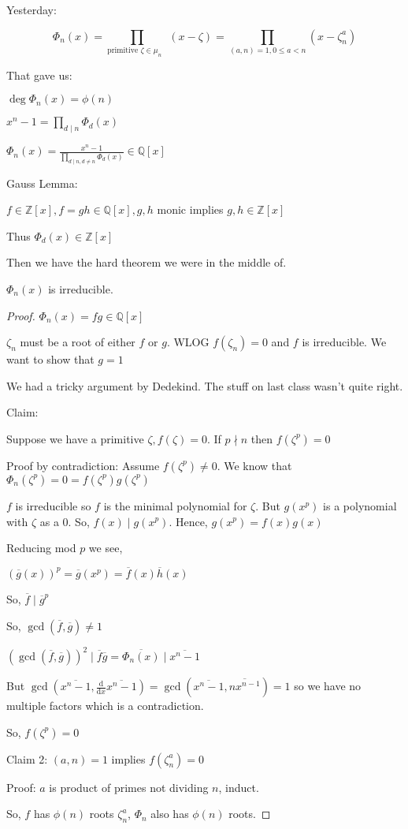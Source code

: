 \documentclass{article}
\theoremstyle{definition}
\begin{document}
Yesterday:

\[
    \Phi _n(x)=\prod _{\text{primitive \(\zeta \in \mu_n\) } } (x-\zeta) = \prod _{(a,n)=1,0\leq a<n} (x-\zeta _n^a)
\]

That gave us:

\(\deg\Phi_n(x)=\phi (n)\) 

\(x^n - 1 = \prod _{d\mid n}\Phi_d(x)\) 

\(\displaystyle \Phi_n(x)=\frac{x^n - 1}{\prod _{d\mid n,d\neq n} \Phi_d(x) } \in \mathbb{Q} [x]\) 

Gauss Lemma:

\(f\in \mathbb{Z} [x],f=gh\in \mathbb{Q} [x],g,h\) monic implies \(g,h\in \mathbb{Z} [x]\)  

Thus \(\Phi_d(x)\in \mathbb{Z} [x]\) 

Then we have the hard theorem we were in the middle of.

\(\Phi_n(x)\) is irreducible.

\begin{proof}
    \(\Phi_n(x)=fg\in\mathbb{Q} [x]\) 

    \(\zeta_n\) must be a root of either \(f\) or \(g\). WLOG \(f(\zeta_n)=0\) and \(f\) is irreducible. We want to show that \(g=1\)
    
    We had a tricky argument by Dedekind. The stuff on last class wasn't quite right.

    Claim:

    Suppose we have a primitive \(\zeta, f(\zeta)=0\). If \(p \nmid n\) then \(f(\zeta^p)=0\) 

    Proof by contradiction: Assume \(f(\zeta^p) \neq 0\). We know that \(\Phi_n(\zeta^p)=0=f(\zeta^p)g(\zeta^p)\)  

    \(f\) is irreducible so \(f\) is the minimal polynomial for \(\zeta \). But \(g(x^p)\) is a polynomial with \(\zeta \) as a \(0\). So, \(f(x)\mid g(x^p)\). Hence, \(g(x^p)=f(x)g(x)\)  

    Reducing mod \(p\) we see,

    \((\overline{g}(x))^p = \overline{g}(x^p)=\overline{f}(x)\overline{h}(x)   \) 

    So, \(\overline{f}\mid \overline{g}^p  \)
    
    So, \(\gcd(\overline{f} ,\overline{g} )\neq 1\)

    \((\gcd(\overline{f},\overline{g}  ))^2 \mid \overline{f} \overline{g} =\overline{\Phi_n(x)} \mid \overline{x^n - 1 } \) 

    But \(\gcd(\overline{x^n - 1},\frac{\mathrm{d}}{\mathrm{d}x} \overline{x^n - 1} ) = \gcd(\overline{x^n - 1 } , \overline{n x^{n-1} } )=1\) so we have no multiple factors which is a contradiction. 

    So, \(f(\zeta^p) = 0\)
    
    Claim 2: \((a,n)=1\) implies \(f(\zeta_n^a)=0\) 

    Proof: \(a\) is product of primes not dividing \(n\), induct.

    So, \(f\) has \(\phi(n)\) roots \(\zeta_n^a\), \(\Phi_n\) also has \(\phi(n)\) roots. 

\end{proof}
\end{document}
